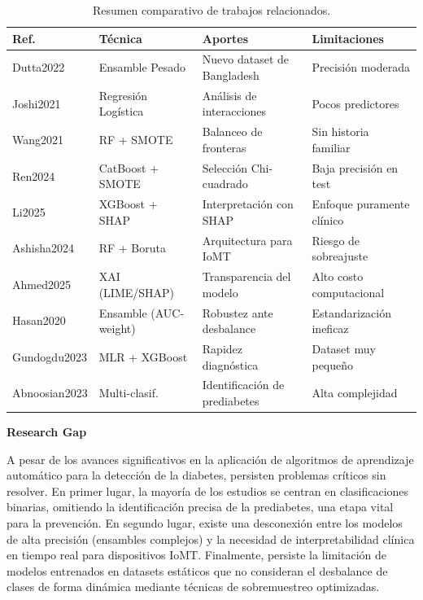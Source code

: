 \documentclass[journal]{IEEEtran}
\begin{document}
\begin{table}[h!]
\centering
\caption{Resumen comparativo de trabajos relacionados.}
\label{tab:resumen}
\footnotesize
\begin{tabular}{|p{1.3cm}|p{1.6cm}|p{1.7cm}|p{1.7cm}|}
\hline
\textbf{Ref.} & \textbf{Técnica} & \textbf{Aportes} & \textbf{Limitaciones} \\
\hline
Dutta2022 & Ensamble Pesado & Nuevo dataset de Bangladesh & Precisión moderada \\
\hline
Joshi2021 & Regresión Logística & Análisis de interacciones & Pocos predictores \\
\hline
Wang2021 & RF + SMOTE & Balanceo de fronteras & Sin historia familiar \\
\hline
Ren2024 & CatBoost + SMOTE & Selección Chi-cuadrado & Baja precisión en test \\
\hline
Li2025 & XGBoost + SHAP & Interpretación con SHAP & Enfoque puramente clínico \\
\hline
Ashisha2024 & RF + Boruta & Arquitectura para IoMT & Riesgo de sobreajuste \\
\hline
Ahmed2025 & XAI (LIME/SHAP) & Transparencia del modelo & Alto costo computacional \\
\hline
Hasan2020 & Ensamble (AUC-weight) & Robustez ante desbalance & Estandarización ineficaz \\
\hline
Gundogdu2023 & MLR + XGBoost & Rapidez diagnóstica & Dataset muy pequeño \\
\hline
Abnoosian2023 & Multi-clasif. & Identificación de prediabetes & Alta complejidad \\
\hline
\end{tabular}
\end{table}

\textbf{Research Gap}

A pesar de los avances significativos en la aplicación de algoritmos de aprendizaje automático para la detección de la diabetes, persisten problemas críticos sin resolver. En primer lugar, la mayoría de los estudios se centran en clasificaciones binarias, omitiendo la identificación precisa de la prediabetes, una etapa vital para la prevención. En segundo lugar, existe una desconexión entre los modelos de alta precisión (ensambles complejos) y la necesidad de interpretabilidad clínica en tiempo real para dispositivos IoMT. Finalmente, persiste la limitación de modelos entrenados en datasets estáticos que no consideran el desbalance de clases de forma dinámica mediante técnicas de sobremuestreo optimizadas.
\end{document}
